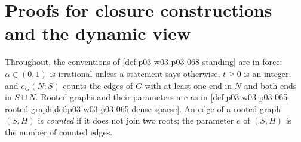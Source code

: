 \section{Proofs for closure constructions and the dynamic view}
\label{sec:annex-p03-w03-p03-068-closure}

Throughout, the conventions of \cref{def:p03-w03-p03-068-standing} are in
force: \(\alpha\in(0,1)\) is irrational unless a statement says otherwise,
\(t\geq0\) is an integer, and \(e_G(N;S)\) counts the edges of \(G\) with at
least one end in \(N\) and both ends in \(S\cup N\).  Rooted graphs and their
parameters are as in
\cref{def:p03-w03-p03-065-rooted-graph,def:p03-w03-p03-065-dense-sparse}.
An edge of a rooted graph \((S,H)\) is \emph{counted} if it does not join two
roots; the parameter \(e\) of \((S,H)\) is the number of counted edges.

